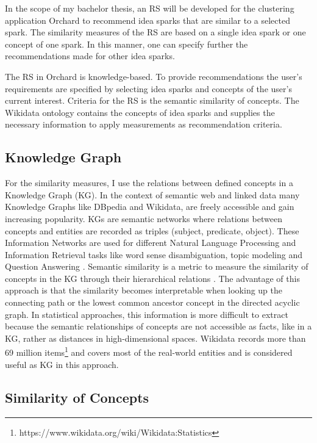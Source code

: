 \documentclass[pdftex,a4paper,12pt]{scrartcl}
\theoremstyle{definition}
\begin{document}
In the scope of my bachelor thesis, an RS will be developed for the clustering application Orchard to recommend idea sparks that are similar to a selected spark. The similarity measures of the RS are based on a single idea spark or one concept of one spark. In this manner, one can specify further the recommendations made for other idea sparks. 

The RS in Orchard is knowledge-based. To provide recommendations the user's requirements are specified by selecting idea sparks and concepts of the user's current interest. Criteria for the RS is the semantic similarity of concepts. The Wikidata ontology contains the concepts of idea sparks and supplies the necessary information to apply measurements as recommendation criteria.
\subsection{Knowledge Graph}
    For the similarity measures, I use the relations between defined concepts in a Knowledge Graph (KG). In the context of semantic web and linked data many Knowledge Graphs like DBpedia and Wikidata, are freely accessible and gain increasing popularity. KGs are semantic networks where relations between concepts and entities are recorded as triples (subject, predicate, object). These Information Networks are used for different Natural Language Processing and Information Retrieval tasks like word sense disambiguation, topic modeling and Question Answering \citep{nastase_topic-driven_2008}. 
    Semantic similarity is a metric to measure the similarity of concepts in the KG through their hierarchical relations \citep{zhu_computing_2017}. The advantage of this approach is that the similarity becomes interpretable when looking up the connecting path or the lowest common ancestor concept in the directed acyclic graph. In statistical approaches, this information is more difficult to extract because the semantic relationships of concepts are not accessible as facts, like in a KG, rather as distances in high-dimensional spaces.
    Wikidata records more than 69 million items\footnote{https://www.wikidata.org/wiki/Wikidata:Statistics} and covers most of the real-world entities and is considered useful as KG in this approach. 

\subsection{Similarity of Concepts}
\end{document}
